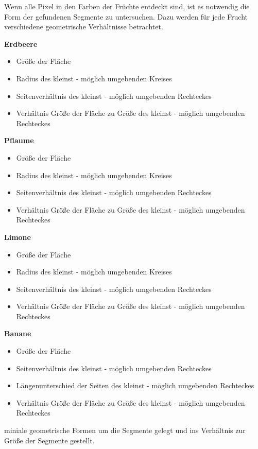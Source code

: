 Wenn alle Pixel in den Farben der Früchte entdeckt sind, ist es notwendig die Form der gefundenen Segmente zu untersuchen. Dazu werden für jede Frucht verschiedene geometrische Verhältnisse betrachtet.

\textbf{Erdbeere}

\begin{itemize}
    \item Größe der Fläche
    \item Radius des kleinst - möglich umgebenden Kreises
    \item Seitenverhältnis des kleinst - möglich umgebenden Rechteckes
    \item Verhältnis Größe der Fläche zu Größe des kleinst - möglich umgebenden Rechteckes
\end{itemize}

\textbf{Pflaume}

\begin{itemize}
    \item Größe der Fläche
    \item Radius des kleinst - möglich umgebenden Kreises
    \item Seitenverhältnis des kleinst - möglich umgebenden Rechteckes
     \item Verhältnis Größe der Fläche zu Größe des kleinst - möglich umgebenden Rechteckes
\end{itemize}

\textbf{Limone}

\begin{itemize}
    \item Größe der Fläche
    \item Radius des kleinst - möglich umgebenden Kreises
    \item Seitenverhältnis des kleinst - möglich umgebenden Rechteckes
     \item Verhältnis Größe der Fläche zu Größe des kleinst - möglich umgebenden Rechteckes
\end{itemize}

\textbf{Banane}

\begin{itemize}
    \item Größe der Fläche
    \item Seitenverhältnis des kleinst - möglich umgebenden Rechteckes
    \item Längenunterschied der Seiten des kleinst - möglich umgebenden Rechteckes
    \item Verhältnis Größe der Fläche zu Größe des kleinst - möglich umgebenden Rechteckes
\end{itemize}

miniale geometrische Formen um die Segmente gelegt und ins Verhältnis zur Größe der Segmente gestellt. 








 


